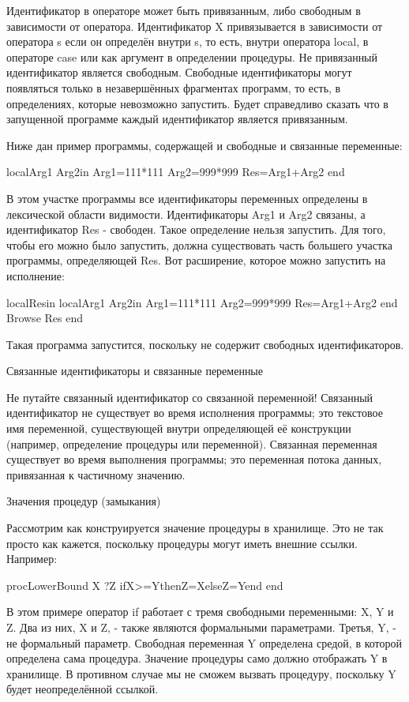 Идентификатор в операторе может быть привязанным, либо свободным в зависимости от оператора. Идентификатор X привязывается в зависимости от оператора s если он определён внутри s, то есть, внутри оператора local, в операторе case или как аргумент в определении процедуры. Не привязанный идентификатор является свободным. Свободные идентификаторы могут появляться только в незавершённых фрагментах программ, то есть, в определениях, которые невозможно запустить. Будет справедливо сказать что в запущенной программе каждый идентификатор является привязанным.

Ниже дан пример программы, содержащей и свободные и связанные переменные:

localArg1 Arg2in
Arg1=111*111
Arg2=999*999
Res=Arg1+Arg2
end

В этом участке программы все идентификаторы переменных определены в лексической области видимости. Идентификаторы Arg1 и Arg2 связаны, а идентификатор Res - свободен. Такое определение нельзя запустить. Для того, чтобы его можно было запустить, должна существовать часть большего участка программы, определяющей Res. Вот расширение, которое можно запустить на исполнение:

localResin
localArg1 Arg2in
Arg1=111*111
Arg2=999*999
Res=Arg1+Arg2
end
{Browse Res}
end

Такая программа запустится, поскольку не содержит свободных идентификаторов.

Связанные идентификаторы и связанные переменные

Не путайте связанный идентификатор со связанной переменной! Связанный идентификатор не существует во время исполнения программы; это текстовое имя переменной, существующей внутри определяющей её конструкции (например, определение процедуры или переменной). Связанная переменная существует во время выполнения программы; это переменная потока данных, привязанная к частичному значению.

Значения процедур (замыкания)

Рассмотрим как конструируется значение процедуры в хранилище. Это не так просто как кажется, поскольку процедуры могут иметь внешние ссылки. Например:

proc{LowerBound X ?Z}
ifX>=YthenZ=XelseZ=Yend
end

В этом примере оператор if работает с тремя свободными переменными: X, Y и Z. Два из них, X и Z, - также являются формальными параметрами. Третья, Y, - не формальный параметр. Свободная переменная Y определена средой, в которой определена сама процедура. Значение процедуры само должно отображать Y в хранилище. В противном случае мы не сможем вызвать процедуру, поскольку Y будет неопределённой ссылкой.

